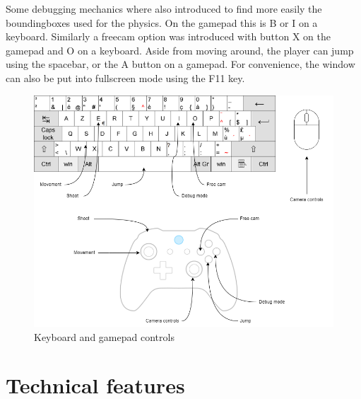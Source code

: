 \documentclass[]{article}
\begin{document}
Some debugging mechanics where also introduced to find more easily the
boundingboxes used for the physics. On the gamepad this is B or I on a keyboard.
Similarly a freecam option was introduced with button X on the gamepad and O on
a keyboard.
Aside from moving around, the player can jump using the spacebar, or the A button on a gamepad. 
For convenience, the window can also be put into fullscreen mode using the F11 key.

\begin{figure}[h!]
      \centering
      \includegraphics[width=\textwidth]{diagram.png}
      \caption{Keyboard and gamepad controls}
      \label{fig:diagram}
\end{figure}
\newpage
\section{Technical features}
\end{document}
